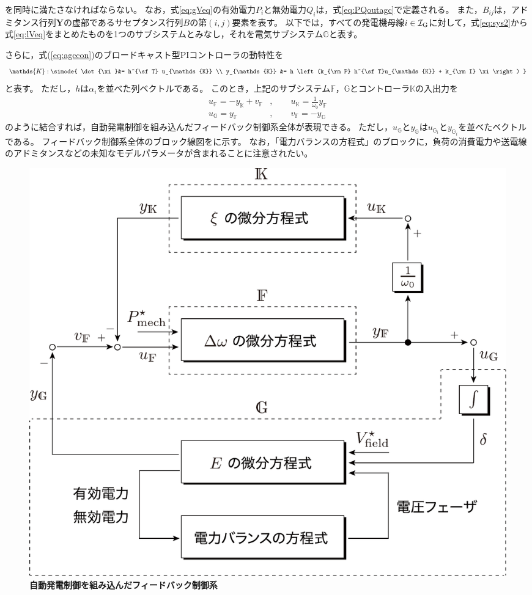 \documentclass[tombow,dvipdfmx]{corona-a5-1.1}
\begin{document}
を同時に満たさなければならない。
なお，式\ref{eq:gVeq}の有効電力$P_i$と無効電力$Q_i$は，式\ref{eq:PQoutagc}で定義される。
また，$B_{ij}$は，アドミタンス行列$\bm{Y}$の虚部であるサセプタンス行列$B$の第$(i,j)$要素を表す。
以下では，すべての発電機母線$i \in \mathcal{I}_{\rm G}$に対して，式\ref{eq:sys2}から式\ref{eq:lVeq}をまとめたものを1つのサブシステムとみなし，それを電気サブシステム$\mathds{G}$と表す。

さらに，式(\ref{eq:agccon})のブロードキャスト型PIコントローラの動特性を
\begin{align}\label{eq:condsK}
\mathds{K}: \simode{
\dot{\xi}&=  h^{\sf T} u_{\mathds{K}} \\
y_{\mathds{K}} &= h \left(k_{\rm P} h^{\sf T}u_{\mathds{K}} +  k_{\rm I} \xi \right)
}
\end{align}
と表す。
ただし，$h$は$\alpha_i$を並べた列ベクトルである。
このとき，上記のサブシステム$\mathds{F}$，$\mathds{G}$とコントローラ$\mathds{K}$の入出力を
\begin{subequations}\label{eq:connds}
\begin{align}
u_{\mathds{F}} = - y_{\mathds{K}} + v_{\mathds{F}}&
,\qquad u_{\mathds{K}} = \frac{1}{\omega_0} y_{\mathds{F}}	\label{eq:connds1}
\\
u_{\mathds{G}} = y_{\mathds{F}}&
,\qquad
v_{\mathds{F}} = - y_{\mathds{G}}		\label{eq:connds2}
\end{align}
\end{subequations}
のように結合すれば，自動発電制御を組み込んだフィードバック制御系全体が表現できる。
ただし，$u_{\mathds{G}}$と$y_{\mathds{G}}$は$u_{\mathds{G}_i}$と$y_{\mathds{G}_i}$を並べたベクトルである。
フィードバック制御系全体のブロック線図をに示す。
なお，「電力バランスの方程式」のブロックに，負荷の消費電力や送電線のアドミタンスなどの未知なモデルパラメータが含まれることに注意されたい。

\begin{figure}[t]
\centering
\includegraphics[width = .85\linewidth]{figs/nonlinBD}
\medskip
\caption{\textbf{自動発電制御を組み込んだフィードバック制御系}}
\label{fig:nonlinBD}
\medskip
\end{figure}
\end{document}
